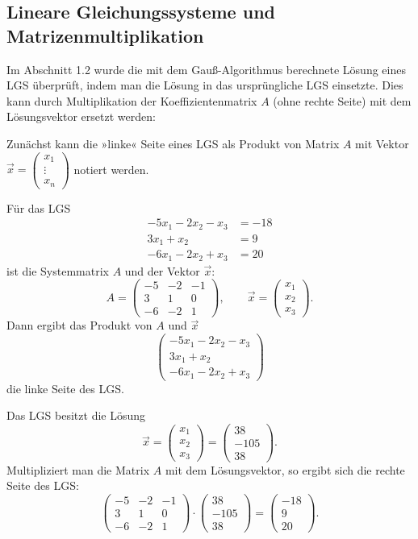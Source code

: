 \subsection{Lineare Gleichungssysteme und Matrizenmultiplikation}

Im Abschnitt 1.2 wurde die mit dem Gauß-Algorithmus berechnete Lösung eines LGS überprüft, indem man die Lösung in das ursprüngliche LGS einsetzte. Dies kann durch Multiplikation der Koeffizientenmatrix $A$ (ohne rechte Seite) mit dem Lösungsvektor ersetzt werden:

Zunächst kann die »linke« Seite eines LGS als Produkt von Matrix $A$ mit Vektor $\vec{x} = \begin{pmatrix} x_1 \\ \vdots \\ x_n \end{pmatrix}$ notiert werden.

Für das LGS
\begin{align*}
  -5x_1 - 2x_2 - x_3 &= -18\\
  3x_1 + x_2 &= 9\\
  -6x_1 - 2x_2 + x_3 &= 20
\end{align*}
ist die Systemmatrix $A$ und der Vektor $\vec{x}$:
\[ A = \begin{pmatrix} -5 & -2 & -1 \\ 3 & 1 & 0 \\ -6 & -2 & 1 \end{pmatrix} , \qquad \vec{x} = \begin{pmatrix} x_1 \\ x_2 \\ x_3 \end{pmatrix} . \]
Dann ergibt das Produkt von $A$ und $\vec{x}$
\[ \begin{pmatrix} -5x_1 - 2x_2 - x_3 \\ 3x_1 + x_2 \\ -6x_1 - 2x_2 + x_3 \end{pmatrix} \]
die linke Seite des LGS.

Das LGS besitzt die Lösung
\[ \vec{x} = \begin{pmatrix} x_1 \\ x_2 \\ x_3 \end{pmatrix} = \begin{pmatrix} 38 \\ -105 \\ 38 \end{pmatrix} . \]
Multipliziert man die Matrix $A$ mit dem Lösungsvektor, so ergibt sich die rechte Seite des LGS:
\[ \begin{pmatrix} -5 & -2 & -1 \\ 3 & 1 & 0 \\ -6 & -2 & 1 \end{pmatrix} \cdot \begin{pmatrix} 38 \\ -105 \\ 38 \end{pmatrix} = \begin{pmatrix} -18 \\ 9 \\ 20 \end{pmatrix} . \]

